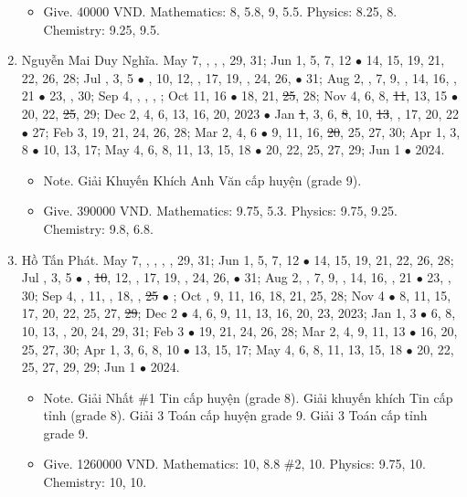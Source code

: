 \documentclass{article}
\begin{document}
\begin{enumerate}
	\begin{itemize}
		\item {\sf Give.} 40000 VND. Mathematics: 8, 5.8, 9, 5.5. Physics: 8.25, 8. Chemistry: 9.25, 9.5.
	\end{itemize}
	\item {\sc Nguyễn Mai Duy Nghĩa.} May 7, , , , 29, 31; Jun 1, 5, 7, 12 $\bullet$ 14, 15, 19, 21, 22, 26, 28; Jul , 3, 5 $\bullet$ , 10, 12, , 17, 19, , 24, 26,  $\bullet$ 31; Aug 2, , 7, 9, , 14, 16, , 21 $\bullet$ 23, , 30; Sep 4, , , , ; Oct 11, 16 $\bullet$ 18, 21, \st{25}, 28; Nov 4, 6, 8, \st{11}, 13, 15 $\bullet$ 20, 22, \st{25}, 29; Dec 2, 4, 6, 13, 16, 20, 2023 $\bullet$ Jan \st{1}, 3, 6, \st{8}, 10, \st{13}, , 17, 20, 22 $\bullet$ 27; Feb 3, 19, 21, 24, 26, 28; Mar 2, 4, 6 $\bullet$ 9, 11, 16, \st{20}, 25, 27, 30; Apr 1, 3, 8 $\bullet$ 10, 13, 17; May 4, 6, 8, 11, 13, 15, 18 $\bullet$ 20, 22, 25, 27, 29; Jun 1 $\bullet$ 2024.
	\begin{itemize}
		\item {\sf Note.} Giải Khuyến Khích Anh Văn cấp huyện (grade 9).
		\item {\sf Give.} 390000 VND. Mathematics: 9.75, 5.3. Physics: 9.75, 9.25. Chemistry: 9.8, 6.8.
	\end{itemize}
	\item {\sc Hồ Tấn Phát.} May 7, , , , , 29, 31; Jun 1, 5, 7, 12 $\bullet$ 14, 15, 19, 21, 22, 26, 28; Jul , 3, 5 $\bullet$ , \st{10}, 12, , 17, 19, , 24, 26,  $\bullet$ 31; Aug 2, , 7, 9, , 14, 16, , 21 $\bullet$ 23, , 30; Sep 4, , 11, , 18, , \st{25} $\bullet$ ; Oct , 9, 11, 16, 18, 21, 25, 28; Nov 4 $\bullet$ 8, 11, 15, 17, 20, 22, 25, 27, \st{29}; Dec 2 $\bullet$ 4, 6, 9, 11, 13, 16, 20, 23, 2023; Jan 1, 3 $\bullet$ 6, 8, 10, 13, , 20, 24, 29, 31; Feb 3 $\bullet$ 19, 21, 24, 26, 28; Mar 2, 4, 9, 11, 13 $\bullet$ 16, 20, 25, 27, 30; Apr 1, 3, 6, 8, 10 $\bullet$ 13, 15, 17; May 4, 6, 8, 11, 13, 15, 18 $\bullet$ 20, 22, 25, 27, 29, 29; Jun 1 $\bullet$ 2024.
	\begin{itemize}
		\item {\sf Note.} Giải Nhất \#1 Tin cấp huyện (grade 8). Giải khuyến khích Tin cấp tỉnh (grade 8). Giải 3 Toán cấp huyện grade 9. Giải 3 Toán cấp tỉnh grade 9.
		\item {\sf Give.} 1260000 VND. Mathematics: 10, 8.8 \#2, 10. Physics: 9.75, 10. Chemistry: 10, 10.

\end{itemize}
\end{enumerate}
\end{document}
